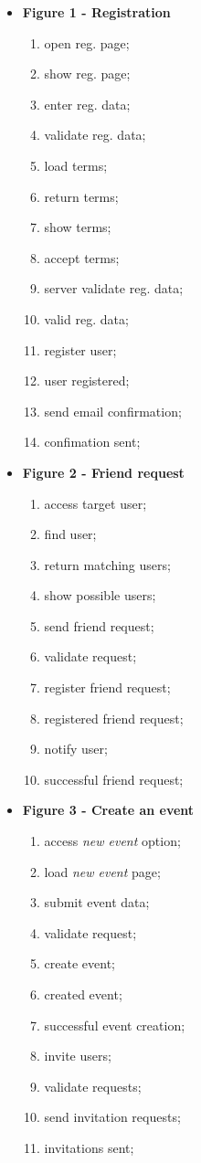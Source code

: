 \documentclass{article}
\begin{document}
		\begin{itemize}
			\item \textbf{Figure 1 - Registration}
			\begin{enumerate}
				\item open reg. page;
				\item show reg. page;
				\item enter reg. data;
				\item validate reg. data;
				\item load terms;
				\item return terms;
				\item show terms;
				\item accept terms;
				\item server validate reg. data;
				\item valid reg. data;
				\item register user;
				\item user registered;
				\item send email confirmation;
				\item confimation sent;
			\end{enumerate}

			\item \textbf{Figure 2 - Friend request}
			\begin{enumerate}
				\item access target user;
				\item find user;
				\item return matching users;
				\item show possible users;
				\item send friend request;
				\item validate request;
				\item register friend request;
				\item registered friend request;
				\item notify user;
				\item successful friend request;
			\end{enumerate}

			\item \textbf{Figure 3 - Create an event}
			\begin{enumerate}
				\item access \textit{new event} option;
				\item load \textit{new event} page;
				\item submit event data;
				\item validate request;
				\item create event;
				\item created event;
				\item successful event creation;
				\item invite users;
				\item validate requests;
				\item send invitation requests;
				\item invitations sent;
			\end{enumerate}
		\end{itemize}
\end{document}
